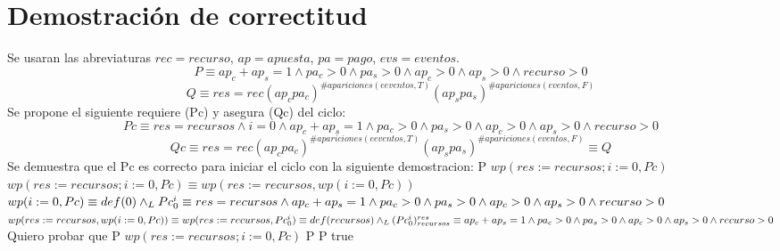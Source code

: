 \documentclass[10pt,a4paper]{article}
\begin{document}
\vspace{0.6cm}

 
\section{Demostración de correctitud}

Se usaran las abreviaturas $rec = recurso$, $ap = apuesta$, $pa = pago$, $evs = eventos$.\\
\begin{equation*}
    P \equiv ap_c + ap_s = 1 \land pa_c > 0 \land pa_s > 0 \land ap_c > 0 \land ap_s > 0 \land recurso > 0
\end{equation*}
\begin{equation*}
    Q \equiv  res = rec (ap_c pa_c)^{\# apariciones(eeventos, T)}(ap_s pa_s)^{\#apariciones(eventos, F)}
\end{equation*}
Se propone el siguiente requiere (Pc) y asegura (Qc) del ciclo:
\begin{equation*}
    Pc \equiv res=recursos \land i=0 \land ap_c + ap_s = 1 \land pa_c > 0 \land pa_s > 0 \land ap_c > 0 \land ap_s > 0 \land recurso > 0
\end{equation*}
\begin{equation*}
    Qc \equiv res = rec (ap_c pa_c)^{\# apariciones(eeventos, T)}(ap_s pa_s)^{\#apariciones(eventos, F)} \equiv Q
\end{equation*}
Se demuestra que el Pc es correcto para iniciar el ciclo con la siguiente demostracion: \newline P \implica $wp(res:=recursos;i:=0,Pc)$ \newline $wp(res:=recursos;i:=0,Pc) \equiv wp(res:=recursos,wp(i:=0,Pc))$ \newline $wp(i:=0,Pc) \equiv def(0) \land _L Pc_{0}^i \equiv res=recursos \land ap_c + ap_s = 1 \land pa_c > 0 \land pa_s > 0 \land ap_c > 0 \land ap_s > 0 \land recurso > 0$ \newline $wp(res:=recursos,wp(i:=0,Pc)) \equiv wp(res:=recursos,Pc_{0}^i) \equiv def(recursos) \land _L (Pc_{0}^i)_{recursos}^{res} \equiv ap_c + ap_s = 1 \land pa_c > 0 \land pa_s > 0 \land ap_c > 0 \land ap_s > 0 \land recurso > 0$ \newline
Quiero probar que \newline P \implica $wp(res:=recursos;i:=0,Pc)$ \newline \equiv P \implica P \equiv true \newline
\end{document}
